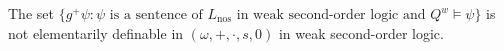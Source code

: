The set $\{g^{+}\psi : \psi \text{ is a sentence of } L_{\text{nos}} \text{ in weak second-order logic and } Q^w \models \psi\}$ is not elementarily definable in $(\omega, +, \cdot, s, 0)$ in weak second-order logic.
